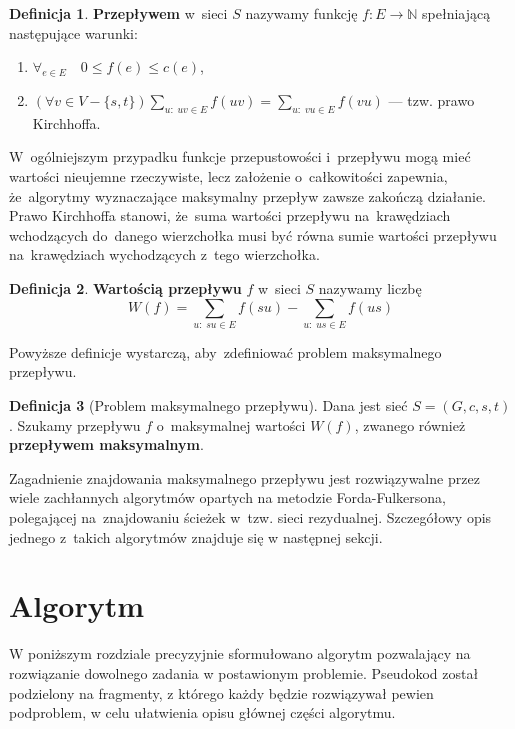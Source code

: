 \documentclass[12pt,a4paper]{article}
\theoremstyle{definition}
\newtheorem{defn}{Definicja}
\begin{document}
\begin{defn}
\textbf{Przepływem} w~sieci $S$ nazywamy funkcję $f : E \to \mathbb{N}$
spełniającą następujące warunki:
\begin{enumerate}
	\item $\forall_{e \in E} \quad 0 \leqslant f(e) \leqslant c(e)$,
	\item $\displaystyle(\forall v \in V - \{ s,t \})
	\sum_{u : \; uv \in E} f(uv) = \sum_{u : \; vu \in E} f(vu)$ 
	--- tzw. prawo Kirchhoffa.
\end{enumerate}
\end{defn}

\noindent
W~ogólniejszym przypadku funkcje przepustowości i~przepływu mogą mieć wartości
nieujemne rzeczywiste, lecz założenie o~całkowitości zapewnia, że~algorytmy
wyznaczające maksymalny przepływ zawsze zakończą działanie.\\

\noindent
Prawo Kirchhoffa stanowi, że~suma wartości przepływu na~krawędziach wchodzących
do~danego wierzchołka musi być równa sumie wartości przepływu na~krawędziach
wychodzących z~tego wierzchołka.

\begin{defn}
\textbf{Wartością przepływu} $f$ w~sieci $S$ nazywamy liczbę
$$ W(f) = \sum_{u: \; su \in E} f(su) - \sum_{u: \; us \in E} f(us) $$
\end{defn}

\noindent
Powyższe definicje wystarczą, aby~zdefiniować problem maksymalnego przepływu.

\begin{defn}[Problem maksymalnego przepływu]
Dana jest sieć $S = (G,c,s,t)$. Szukamy przepływu $f$ o~maksymalnej wartości
$W(f)$, zwanego również \textbf{przepływem maksymalnym}.
\end{defn}

\noindent
Zagadnienie znajdowania maksymalnego przepływu jest rozwiązywalne przez
wiele zachłannych algorytmów opartych na metodzie Forda-Fulkersona,
polegającej na~znajdowaniu ścieżek w~tzw. sieci rezydualnej. Szczegółowy
opis jednego z~takich algorytmów znajduje się w następnej sekcji.

\section{Algorytm}
\label{sec:algorithm}
W poniższym rozdziale precyzyjnie sformułowano algorytm pozwalający na rozwiązanie dowolnego zadania w postawionym problemie. Pseudokod został podzielony na fragmenty, z którego każdy będzie rozwiązywał pewien podproblem, w celu ułatwienia opisu głównej części algorytmu.
\end{document}
